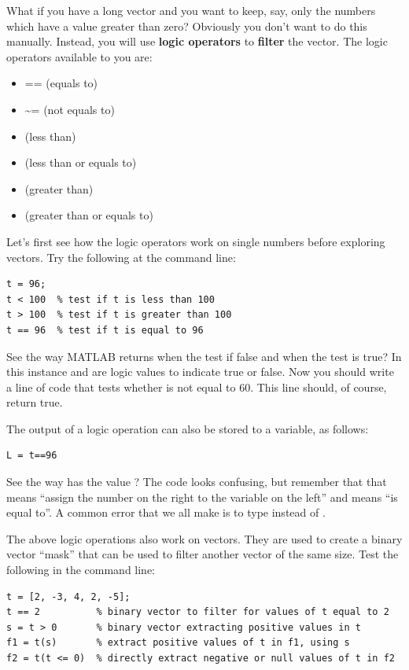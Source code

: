 \documentclass{article}
\begin{document}
What if you have a long vector and you want to keep, say, only the numbers which have a value greater than zero?
Obviously you don't want to do this manually.
Instead, you will use \textbf{logic operators} to \textbf{filter} the vector.
The logic operators available to you are:
\begin{itemize}
\item {==} (equals to)
\item {\~{}=} (not equals to)
\item \mcode{<} (less than)
\item \mcode{<=} (less than or equals to)
\item \mcode{>} (greater than)
\item \mcode{>=} (greater than or equals to)
\end{itemize}

Let's first see how the logic operators work on single numbers before exploring vectors.
Try the following at the command line:
\begin{lstlisting}
t = 96;
t < 100  % test if t is less than 100
t > 100  % test if t is greater than 100
t == 96  % test if t is equal to 96
\end{lstlisting}

See the way MATLAB returns  when the test if false and  when the test is true?
In this instance  and  are logic values to indicate true or false.
Now you should write a line of code that tests whether  is not equal to 60.
This line should, of course, return true.

The output of a logic operation can also be stored to a variable, as follows:

\begin{lstlisting}
L = t==96
\end{lstlisting}

See the way  has the value ?
The code looks confusing, but remember that that \mcode{=} means ``assign the number on the right to the variable on the left'' and \mcode{==} means ``is equal to''.
A common error that we all make is to type  instead of .

The above logic operations also work on vectors.
They are used to create a binary vector ``mask'' that can be used to filter another vector of the same size.
Test the following in the command line:
\begin{lstlisting}
t = [2, -3, 4, 2, -5];
t == 2          % binary vector to filter for values of t equal to 2
s = t > 0       % binary vector extracting positive values in t
f1 = t(s)       % extract positive values of t in f1, using s
f2 = t(t <= 0)  % directly extract negative or null values of t in f2
\end{lstlisting}
\end{document}
